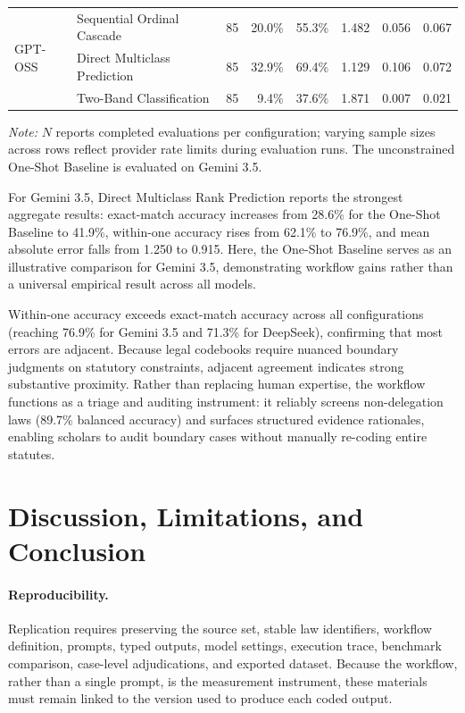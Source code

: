 \documentclass[runningheads]{llncs}
\begin{document}
\begin{table}[t]
\begin{threeparttable}
\begin{tabular}{@{}llrrrrrr@{}}
\multirow{3}{*}{GPT-OSS} 
  & Sequential Ordinal Cascade        & 85 & 20.0\% & 55.3\% & 1.482 & 0.056 & 0.067 \\
  & Direct Multiclass Prediction      & 85 & 32.9\% & 69.4\% & 1.129 & 0.106 & 0.072 \\
  & Two-Band Classification           & 85 & 9.4\%  & 37.6\% & 1.871 & 0.007 & 0.021 \\
\bottomrule
\end{tabular}

\begin{tablenotes}
\scriptsize
\item[] \textit{Note:} $N$ reports completed evaluations per configuration; varying sample sizes across rows reflect provider rate limits during evaluation runs. The unconstrained One-Shot Baseline is evaluated on Gemini 3.5.
\end{tablenotes}

\end{threeparttable}
\end{table}

For Gemini 3.5, Direct Multiclass Rank Prediction reports the strongest aggregate results: exact-match accuracy increases from 28.6\% for the One-Shot Baseline to 41.9\%, within-one accuracy rises from 62.1\% to 76.9\%, and mean absolute error falls from 1.250 to 0.915. Here, the One-Shot Baseline serves as an illustrative comparison for Gemini 3.5, demonstrating workflow gains rather than a universal empirical result across all models.

Within-one accuracy exceeds exact-match accuracy across all configurations (reaching 76.9\% for Gemini 3.5 and 71.3\% for DeepSeek), confirming that most errors are adjacent. Because legal codebooks require nuanced boundary judgments on statutory constraints, adjacent agreement indicates strong substantive proximity. Rather than replacing human expertise, the workflow functions as a triage and auditing instrument: it reliably screens non-delegation laws (89.7\% balanced accuracy) and surfaces structured evidence rationales, enabling scholars to audit boundary cases without manually re-coding entire statutes.

\vspace{-0.5cm}
\section{Discussion, Limitations, and Conclusion}

\paragraph{Reproducibility.} Replication requires preserving the source set, stable law identifiers, workflow definition, prompts, typed outputs, model settings, execution trace, benchmark comparison, case-level adjudications, and exported dataset. Because the workflow, rather than a single prompt, is the measurement instrument, these materials must remain linked to the version used to produce each coded output.
\end{document}
